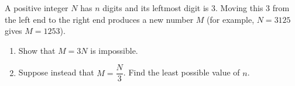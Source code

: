 A positive integer $N$ has $n$ digits and its leftmost digit is $3$. Moving this $3$ from the left end to the right end produces a new number $M$ (for example, $N=3125$ gives $M=1253$).
\begin{enumerate}
\item[(a)] Show that $M=3N$ is impossible.
\item[(b)] Suppose instead that $M=\dfrac {N}{3}$. Find the least possible value of $n$.
\end{enumerate}
